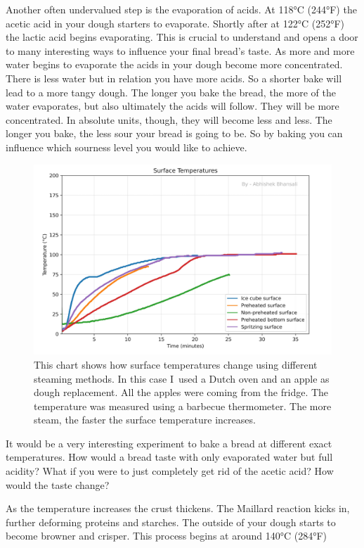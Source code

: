 Another often undervalued step is the evaporation of acids. At
118°C (244°F) the acetic acid in your dough starters to evaporate.
Shortly after at 122°C (252°F) the lactic acid begins evaporating.
This is crucial to understand and opens a door to many interesting
ways to influence your final bread's taste. As more and more water
begins to evaporate the acids in your dough become more concentrated.
There is less water but in relation you have more acids. So a shorter
bake will lead to a more tangy dough. The longer you bake the bread,
the more of the water evaporates, but also ultimately the acids will follow.
They will be more concentrated. In absolute units, though, they
will become less and less. The longer you bake, the less sour
your bread is going to be. So by baking you can
influence which sourness level you would like to achieve.

\begin{figure}[!htb]
  \includegraphics[width=\textwidth]{baking-experiment-temperatures.png}
  \caption{This chart shows how surface temperatures change using
  different steaming methods. In this case I~used a Dutch oven and an apple as
  dough replacement. All the apples were coming from the fridge. The temperature
  was measured using a barbecue thermometer.
  The more steam, the faster the surface temperature increases.}
\end{figure}

It would be a very interesting experiment to bake a bread at different exact
temperatures. How would a bread taste with only evaporated water but
full acidity? What if you were to just completely get rid of the acetic
acid? How would the taste change?

As the temperature increases
the crust thickens. The Maillard reaction kicks in, further deforming
proteins and starches. The outside of your dough starts to become
browner and crisper. This process begins at around 140°C (284°F)

